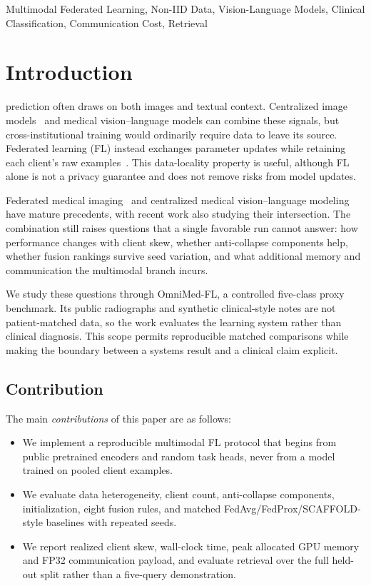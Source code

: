 \documentclass[letterpaper, conference]{IEEEtran}
\begin{document}
\begin{IEEEkeywords}
Multimodal Federated Learning, Non-IID Data, Vision-Language Models, Clinical Classification, Communication Cost, Retrieval
\end{IEEEkeywords}

\section{Introduction}

 prediction often draws on both images and textual
context. Centralized image models~\cite{Rajpurkar2017,Irvin2019} and medical
vision--language models can combine these signals, but cross-institutional
training would ordinarily require data to leave its source. Federated learning
(FL) instead exchanges parameter updates while retaining each client's raw
examples~\cite{McMahan2017}. This data-locality property is useful, although FL
alone is not a privacy guarantee and does not remove risks from model updates.

Federated medical imaging~\cite{Sheller2020,Dou2021,Kaissis2021} and centralized
medical vision--language modeling have mature precedents, with recent work also
studying their intersection. The combination still raises questions that a single favorable run cannot answer:
how performance changes with client skew, whether anti-collapse components help,
whether fusion rankings survive seed variation, and what additional memory and
communication the multimodal branch incurs.

We study these questions through OmniMed-FL, a controlled five-class proxy
benchmark. Its public radiographs and synthetic clinical-style notes are not
patient-matched data, so the work evaluates the learning system rather than
clinical diagnosis. This scope permits reproducible matched comparisons while
making the boundary between a systems result and a clinical claim explicit.


\subsection{Contribution}
The main \textit{contributions} of this paper are as follows:
\begin{itemize}
\item We implement a reproducible multimodal FL protocol that begins from public
pretrained encoders and random task heads, never from a model trained on pooled
client examples.
\item We evaluate data heterogeneity, client count, anti-collapse components,
initialization, eight fusion rules, and matched FedAvg/FedProx/SCAFFOLD-style
baselines with repeated seeds.
\item We report realized client skew, wall-clock time, peak allocated GPU memory
and FP32 communication payload, and evaluate retrieval over the full held-out
split rather than a five-query demonstration.
\end{itemize}
\end{document}
